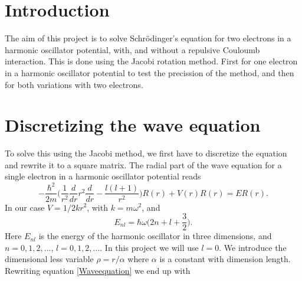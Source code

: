 \documentclass{aa}   %
\begin{document}
  



\section{Introduction}   \label{sec:Intro}
The aim of this project is to solve Schrödinger's equation for two electrons in a harmonic oscillator potential, with, and without a repulsive Couloumb interaction. This is done using the Jacobi rotation method. First for one electron in a harmonic oscillator potential to test the precission of the method, and then for both variations with two electrons.
\section{Discretizing the wave equation}    \label{sec:Discretizing}
To solve this using the Jacobi method, we first have to discretize the equation and rewrite it to a square matrix.
The radial part of the wave equation for a single electron in a harmonic oscillator potential reads
\begin{equation}\label{Waveequation}
 -\frac{\hbar^2}{2m}\bigg(\frac{1}{r^2}\frac{d}{dr}r^2\frac{d}{dr} - \frac{l(l+1)}{r^2}\bigg)R(r) + V(r)R(r) = ER(r).
\end{equation}
In our case $V = 1/2 kr^2$, with $k = m\omega^2$, and 
\begin{equation}
\label{Energy}
E_{nl} = \hbar\omega \bigg(2n + l +\frac{3}{2}\bigg).
\end{equation}
Here $E_{nl}$ is the energy of the harmonic oscillator in three dimensions, and $n = 0,1,2,...$, $l = 0,1,2,...$. In this project we will use $l = 0$. We introduce the dimensional less variable $\rho = r/\alpha$ where $\alpha$ is a constant with dimension length. Rewriting equation \ref{Waveequation} we end up with
\end{document}
